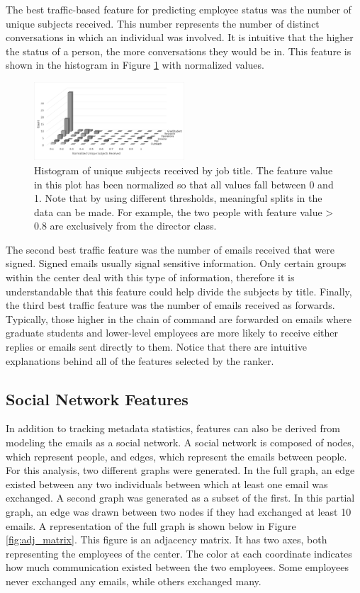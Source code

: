 \documentclass{article}
\begin{document}
The best traffic-based feature for predicting employee status was the number of unique subjects received.  This number represents the number of distinct conversations in which an individual was involved.  It is intuitive that the higher the status of a person, the more conversations they would be in.  This feature is shown in the histogram in Figure \ref{fig:traffic_ex_hist} with normalized values. 
\begin{figure}[H]
    \centering
        \includegraphics[width=0.5\textwidth]{Unique_subjects_rec_hist}
        \caption{Histogram of unique subjects received by job title.  The feature value in this plot has been normalized so that all values fall between 0 and 1.  Note that by using different thresholds, meaningful splits in the data can be made.  For example, the two people with feature value > 0.8 are exclusively from the director class.}
        \label{fig:traffic_ex_hist}
\end{figure}

The second best traffic feature was the number of emails received that were signed.  Signed emails usually signal sensitive information.  Only certain groups within the center deal with this type of information, therefore it is understandable that this feature could help divide the subjects by title.  Finally, the third best traffic feature was the number of emails received as forwards.  Typically, those higher in the chain of command are forwarded on emails where graduate students and lower-level employees are more likely to receive either replies or emails sent directly to them.  Notice that there are intuitive explanations behind all of the features selected by the ranker.


\subsection{Social Network Features}
In addition to tracking metadata statistics, features can also be derived from modeling the emails as a social network.  A social network is composed of nodes, which represent people, and edges, which represent the emails between people.  For this analysis, two different graphs were generated.  In the full graph, an edge existed between any two individuals between which at least one email was exchanged.  A second graph was generated as a subset of the first.  In this partial graph, an edge was drawn between two nodes if they had exchanged at least 10 emails.  A representation of the full graph is shown below in Figure \ref{fig:adj_matrix}.  This figure is an adjacency matrix.  It has two axes, both representing the employees of the center.  The color at each coordinate indicates how much communication existed between the two employees.  Some employees never exchanged any emails, while others exchanged many.
\end{document}
